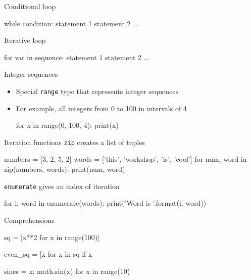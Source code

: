 \documentclass[noamssymb,svgnames]{beamer}
\newcommand{\obj}[1]{\texttt{\color{darkblue}#1}}
\begin{document}
\begin{frame}[fragile]{Conditional loop}
  \begin{python}
      while condition:
          statement 1
          statement 2
          ...
  \end{python}
\end{frame}

\begin{frame}[fragile]{Iterative loop}
  \begin{python}
      for var in sequence:
          statement 1
          statement 2
          ...
  \end{python}
\end{frame}

\begin{frame}[fragile]{Integer sequences}
  \begin{itemize}
  \item Special \obj{range} type that represents integer sequences
  \item For example, all integers from 0 to 100 in intervals of 4
    \begin{python}
        for x in range(0, 100, 4):
            print(x)
    \end{python}
  \end{itemize}
\end{frame}

\begin{frame}[fragile]{Iteration functions}
  \obj{zip} creates a list of tuples
  \begin{python}
    numbers = [3, 2, 5, 2]
    words = ['this', 'workshop', 'is', 'cool']
    for num, word in zip(numbers, words):
        print(num, word)
  \end{python}
  \vfill
  \obj{enumerate} gives an index of iteration
  \begin{python}
    for i, word in enumerate(words):
        print('Word {} is {}'.format(i, word))
  \end{python}
\end{frame}

\begin{frame}[fragile]{Comprehensions}
  \begin{python}
    sq = [x**2 for x in range(100)]

    even_sq = [x for x in sq if x %

    sines = {x: math.sin(x) for x in range(10)}
  \end{python}
\end{frame}
\end{document}
